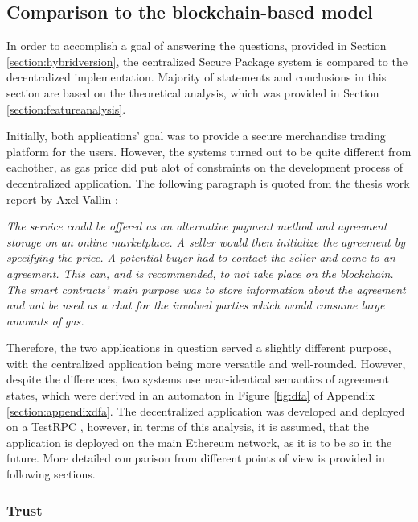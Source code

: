 \subsection{Comparison to the blockchain-based model} \label{section:blockchaincomp}

In order to accomplish a goal of answering the questions, provided in Section \ref{section:hybridversion}, the centralized Secure Package system is compared to the decentralized implementation. Majority of statements and conclusions in this section are based on the theoretical analysis, which was provided in Section \ref{section:featureanalysis}. 

Initially, both applications' goal was to provide a secure merchandise trading platform for the users. However, the systems turned out to be quite different from eachother, as gas price did put alot of constraints on the development process of decentralized application. The following paragraph is quoted from the thesis work report by Axel Vallin \citep{axelrapport}:

\begin{displayquote}
\textit{The service could be offered as an alternative payment method and agreement storage on an online marketplace. A seller would then initialize the agreement by specifying the price. A potential buyer had to contact the seller and come to an agreement. This can, and is recommended, to not take place on the blockchain. The smart contracts’ main purpose was to store information about the agreement and not be used as a chat for the involved parties which would consume large amounts of gas.}
\end{displayquote}

Therefore, the two applications in question served a slightly different purpose, with the centralized application being more versatile and well-rounded. However, despite the differences, two systems use near-identical semantics of agreement states, which were derived in an automaton in Figure \ref{fig:dfa} of Appendix \ref{section:appendixdfa}. The decentralized application was developed and deployed on a TestRPC \citep{testrpc}, however, in terms of this analysis, it is assumed, that the application is deployed on the main Ethereum network, as it is to be so in the future. More detailed comparison from different points of view is provided in following sections.

\subsubsection{Trust}

